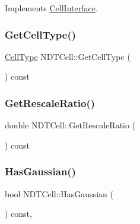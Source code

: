 Implements \hyperlink{classCellInterface_a77bb8db9ba84ecb98622b18d70854090}{Cell\+Interface}.

\mbox{\label{classNDTCell_af70ecb6a8eb56f08de225ab49021bf15}} 
\subsubsection{\texorpdfstring{Get\+Cell\+Type()}{GetCellType()}}
{\footnotesize\ttfamily \hyperlink{classNDTCell_abd36cc88f0ef7145a126ed0058ea2f6e}{Cell\+Type} N\+D\+T\+Cell\+::\+Get\+Cell\+Type (\begin{DoxyParamCaption}{ }\end{DoxyParamCaption}) const\hspace{0.3cm}{\ttfamily [inline]}}

\mbox{\label{classNDTCell_a94772575872591b3723e9f19b9e59031}} 
\subsubsection{\texorpdfstring{Get\+Rescale\+Ratio()}{GetRescaleRatio()}}
{\footnotesize\ttfamily double N\+D\+T\+Cell\+::\+Get\+Rescale\+Ratio (\begin{DoxyParamCaption}{ }\end{DoxyParamCaption}) const\hspace{0.3cm}{\ttfamily [inline]}}

\mbox{\label{classNDTCell_abe1ad036f849e989f9f32f2b7c27530e}} 
\subsubsection{\texorpdfstring{Has\+Gaussian()}{HasGaussian()}}
{\footnotesize\ttfamily bool N\+D\+T\+Cell\+::\+Has\+Gaussian (\begin{DoxyParamCaption}{ }\end{DoxyParamCaption}) const\hspace{0.3cm}{\ttfamily [override]}, {\ttfamily [virtual]}}



